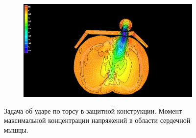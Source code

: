 \begin{figure}[H]
\centering
\begin{subfigure}[b]{0.6\textwidth}
\centering
\includegraphics[width=\textwidth]{png/cranium/chest-res-06.png}
\end{subfigure}
\caption{Задача об ударе по торсу в защитной конструкции. Момент максимальной концентрации напряжений в области сердечной мышцы.}
\label{pic:chest_res}
\end{figure}

